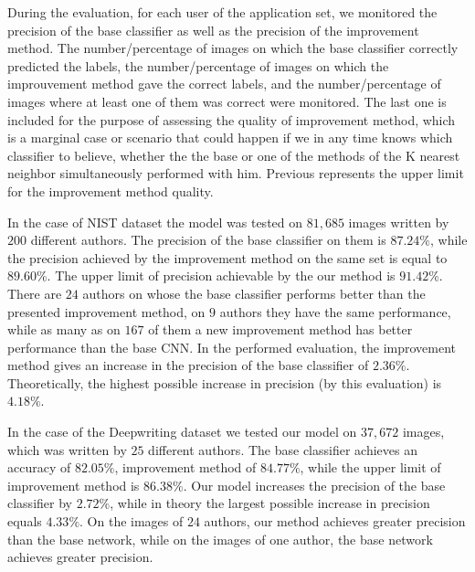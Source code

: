 \documentclass{article}
\begin{document}
During the evaluation, for each user of the application set, we monitored the precision of the base classifier as well as the precision of the improvement method.  
The number/percentage of images on which the base classifier correctly predicted the labels, the number/percentage of images on which the improuvement method gave the correct labels, 
and the number/percentage of images where at least one of them was correct were monitored. 
The last one is included for the purpose of assessing the quality of improvement method, 
which is a marginal case or scenario that could happen if we in any time knows which classifier to believe, 
whether the the base or one of the methods of the K nearest neighbor simultaneously performed with him. 
Previous represents the upper limit for the improvement method quality.

In the case of NIST dataset the model was tested on $81,685$ images written by $200$ different authors. 
The precision of the base classifier on them is $87.24\%$, while the precision achieved by the improvement method on the same set is equal to $89.60\%$. 
The upper limit of precision achievable by the our method is $91.42\%$. 
There are $24$ authors on whose the base classifier performs better than the presented improvement method, on $9$ authors they have the same performance, 
while as many as on $167$ of them a new improvement method has better performance than the base CNN. 
In the performed evaluation, the improvement method gives an increase in the precision of the base classifier of $2.36\%$. 
Theoretically, the highest possible increase in precision (by this evaluation) is $4.18\%$. 

In the case of the Deepwriting dataset we tested our model on $37,672$ images, which was written by $25$ different authors. 
The base classifier achieves an accuracy of $82.05\%$, improvement method of $84.77\%$, while the upper limit of improvement method is $86.38\%$. 
Our model increases the precision of the base classifier by $2.72\%$, while in theory the largest possible increase in precision equals $4.33\%$. 
On the images of $24$ authors, our method achieves greater precision than the base network, while on the images of one author, the base network achieves greater precision. 


\end{document}
